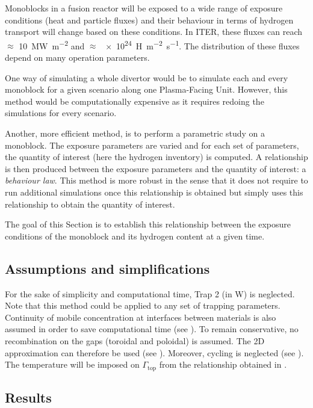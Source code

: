 Monoblocks in a fusion reactor will be exposed to a wide range of exposure conditions (heat and particle fluxes) and their behaviour in terms of hydrogen transport will change based on these conditions.
In ITER, these fluxes can reach $\approx$ \SI{10}{MW.m^{-2}} and $\approx$ \SI{e24}{H.m^{-2}.s^{-1}}.
The distribution of these fluxes depend on many operation parameters.

One way of simulating a whole divertor would be to simulate each and every monoblock for a given scenario along one Plasma-Facing Unit.
However, this method would be computationally expensive as it requires redoing the simulations for every scenario.

Another, more efficient method, is to perform a parametric study on a monoblock.
The exposure parameters are varied and for each set of parameters, the quantity of interest (here the hydrogen inventory) is computed.
A relationship is then produced between the exposure parameters and the quantity of interest: a \textit{behaviour law}.
This method is more robust in the sense that it does not require to run additional simulations once this relationship is obtained but simply uses this relationship to obtain the quantity of interest.

The goal of this Section is to establish this relationship between the exposure conditions of the monoblock and its hydrogen content at a given time.

\subsection{Assumptions and simplifications}

For the sake of simplicity and computational time, Trap 2 (in W) is neglected.
Note that this method could be applied to any set of trapping parameters.
Continuity of mobile concentration at interfaces between materials is also assumed in order to save computational time (see ).
To remain conservative, no recombination on the gaps (toroidal and poloidal) is assumed.
The 2D approximation can therefore be used (see ).
Moreover, cycling is neglected (see ).
The temperature will be imposed on $\Gamma_\mathrm{top}$ from the relationship obtained in .


\subsection{Results}

